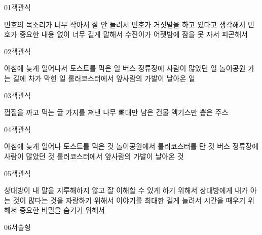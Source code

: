 \documentclass[fs11,seriesFre]{korfarm-base}
\begin{document}
\kfActivityBg \par{}\par\nopagebreak[4]\smallskip\nopagebreak[4]


\begin{kfQBlock}{01}{객관식}
\begin{kfChoices}
\kfChoice 민호의 목소리가 너무 작아서 잘 안 들려서
\kfChoice 민호가 거짓말을 하고 있다고 생각해서
\kfChoice 민호가 중요한 내용 없이 너무 길게 말해서
\kfChoice 수진이가 어젯밤에 잠을 못 자서 피곤해서
\end{kfChoices}
\end{kfQBlock}
\begin{kfQBlock}{02}{객관식}
\begin{kfChoices}
\kfChoice 아침에 늦게 일어나서 토스트를 먹은 일
\kfChoice 버스 정류장에 사람이 많았던 일
\kfChoice 놀이공원 가는 길에 차가 막힌 일
\kfChoice 롤러코스터에서 앞사람의 가발이 날아온 일
\end{kfChoices}
\end{kfQBlock}
\begin{kfQBlock}{03}{객관식}
\begin{kfChoices}
\kfChoice 껍질을 까고 먹는 귤
\kfChoice 가지를 쳐낸 나무
\kfChoice 뼈대만 남은 건물
\kfChoice 엑기스만 뽑은 주스
\end{kfChoices}
\end{kfQBlock}
\begin{kfQBlock}{04}{객관식}
\begin{kfChoices}
\kfChoice 아침에 늦게 일어나 토스트를 먹은 것
\kfChoice 놀이공원에서 롤러코스터를 탄 것
\kfChoice 버스 정류장에 사람이 많았던 것
\kfChoice 롤러코스터에서 앞사람의 가발이 날아온 것
\end{kfChoices}
\end{kfQBlock}
\begin{kfQBlock}{05}{객관식}
\begin{kfChoices}
\kfChoice 상대방이 내 말을 지루해하지 않고 잘 이해할 수 있게 하기 위해서
\kfChoice 상대방에게 내가 아는 것이 많다는 것을 자랑하기 위해서
\kfChoice 이야기를 최대한 길게 늘려서 시간을 때우기 위해서
\kfChoice 중요한 비밀을 숨기기 위해서
\end{kfChoices}
\end{kfQBlock}
\begin{kfQBlock}{06}{서술형}
\end{kfQBlock}
\end{document}

